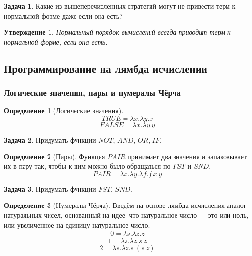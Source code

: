 \documentclass[10pt,twoside]{article}
\theoremstyle{plain}
\newtheorem{ass}{Утверждение}
\theoremstyle{definition}
\newtheorem{defi}{Определение}
\newtheorem{problem}{Задача}
\begin{document}
\begin{problem}
  Какие из вышеперечисленных стратегий могут не привести терм к нормальной форме даже если она есть?
\end{problem}

\begin{ass}
  Нормальный порядок вычислений всегда приводит терм к нормальной форме, если она есть.
\end{ass}

\subsection{Программирование на лямбда исчислении}

\subsubsection{Логические значения, пары и нумералы Чёрча}

\begin{defi}[Логические значения]
  $$TRUE = \lambda x.\lambda y.x$$
  $$FALSE = \lambda x.\lambda y.y$$
\end{defi}

\begin{problem}
  Придумать функции $NOT$, $AND$, $OR$, $IF$.
\begin{comment}
    $$IF = \lambda b.\lambda x.\lambda y.b\ x\ y$$
    $$NOT = \lambda b.IF\ b\ FALSE\ TRUE$$
    $$NOT = \lambda b.\lambda t.\lambda f.b\ f\ t$$
    $$AND = \lambda x.\lambda y.x\ y\ FALSE$$
    $$OR = \lambda x.\lambda y.x\ TRUE\ y$$
\end{comment}
\end{problem}

\begin{defi}[Пары]
  Функция $PAIR$ принимает два значения и запаковывает их в пару так, чтобы к ним можно было обращаться по $FST$ и $SND$.
  $$PAIR = \lambda x.\lambda y.\lambda f.f\ x\ y$$
\end{defi}

\begin{problem}
  Придумать функции $FST$, $SND$.
\begin{comment}
    $$FST = \lambda p.p\ TRUE$$
    $$SND = \lambda p.p\ FALSE$$
\end{comment}
\end{problem}

\begin{defi}[Нумералы Чёрча]
  Введём на основе лямбда-исчисления аналог натуральных чисел, основанный на идее, что натуральное число — это или ноль, или увеличенное на единицу натуральное число.
  $$\bar 0 = \lambda s.\lambda z.z$$
  $$\bar 1 = \lambda s.\lambda z.s\ z$$
  $$\bar 2 = \lambda s.\lambda z.s\ (s\ z)$$
\end{defi}
\end{document}
